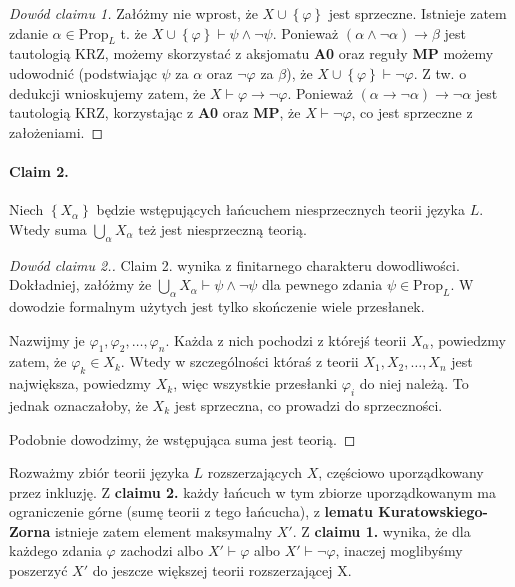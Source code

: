\begin{proof}[Dowód claimu 1]
Załóżmy nie wprost, że \( X \cup \left\{ \varphi \right\} \) jest sprzeczne. Istnieje zatem zdanie \( \alpha \in \mathrm{Prop}_L \) t. że \( X \cup \left\{ \varphi \right\} \vdash \psi \wedge \neg \psi \). Ponieważ \( (\alpha \wedge \neg \alpha) \to \beta \) jest tautologią KRZ, możemy skorzystać z aksjomatu \textbf{A0} oraz reguły \textbf{MP} możemy udowodnić (podstwiając \( \psi \) za \( \alpha \) oraz \( \neg\varphi \) za \( \beta \)), że \( X \cup \left\{ \varphi \right\} \vdash \neg\varphi\). Z tw. o dedukcji wnioskujemy zatem, że \( X \vdash \varphi \to \neg\varphi \). Ponieważ \( (\alpha \to \neg\alpha) \to \neg\alpha \) jest tautologią KRZ, korzystając z \textbf{A0} oraz \textbf{MP}, że \( X \vdash \neg\varphi \), co jest sprzeczne z założeniami. 
\end{proof}


\paragraph{Claim 2.} Niech \( \left\{ X_\alpha \right\} \) będzie wstępujących łańcuchem niesprzecznych teorii języka \( L \). Wtedy suma \( \bigcup_\alpha X_\alpha \) też jest niesprzeczną teorią.

\begin{proof}[Dowód claimu 2.]
    Claim 2. wynika z finitarnego charakteru dowodliwości. Dokładniej, załóżmy że \( \bigcup_\alpha X_\alpha \vdash \psi \wedge \neg \psi \) dla pewnego zdania \( \psi \in \mathrm{Prop}_L \). W dowodzie formalnym użytych jest tylko skończenie wiele przesłanek.

    Nazwijmy je \( \varphi_1, \varphi_2, \ldots, \varphi_n \). Każda z nich pochodzi z którejś teorii \( X_\alpha \), powiedzmy zatem, że \( \varphi_k \in X_k \). Wtedy w szczególności któraś z teorii \( X_1, X_2, \ldots, X_n \) jest największa, powiedzmy \( X_k \), więc wszystkie przesłanki \( \varphi_i \) do niej należą. To jednak oznaczałoby, że \( X_k \) jest sprzeczna, co prowadzi do sprzeczności.

    Podobnie dowodzimy, że wstępująca suma jest teorią.
\end{proof}

Rozważmy zbiór teorii języka \( L \) rozszerzających \( X \), częściowo uporządkowany przez inkluzję. Z \textbf{claimu 2.} każdy łańcuch w tym zbiorze uporządkowanym ma ograniczenie górne (sumę teorii z tego łańcucha), z \textbf{lematu Kuratowskiego-Zorna} istnieje zatem element maksymalny \( X' \). Z \textbf{claimu 1.} wynika, że dla każdego zdania \( \varphi \) zachodzi albo \( X' \vdash \varphi \) albo \( X' \vdash \neg\varphi \), inaczej moglibyśmy poszerzyć \( X' \) do jeszcze większej teorii rozszerzającej X.
